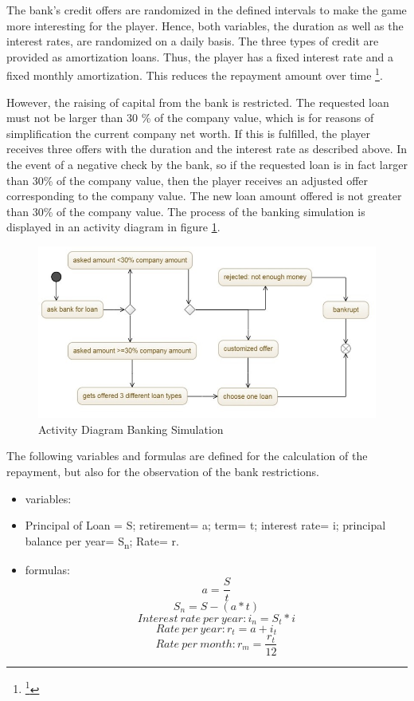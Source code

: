The bank's credit offers are randomized in the defined intervals to make the game more interesting for the player. Hence, both variables, the duration as well as the interest rates, are randomized on a daily basis. The three types of credit are provided as amortization loans. Thus, the player has a fixed interest rate and a fixed monthly amortization. This reduces the repayment amount over time \footnote{\footnote{https://www.investopedia.com/terms/a/amortized\_loan.asp}}.

However, the raising of capital from the bank is restricted.
The requested loan must not be larger than 30 \% of the company value, which is for reasons of simplification the current company net worth. If this is fulfilled, the player receives three offers with the duration and the interest rate as described above. In the event of a negative check by the bank, so if the requested loan is in fact larger than 30\% of the company value, then the player receives an adjusted offer corresponding to the company value. The new loan amount offered is not greater than 30\% of the company value. The process of the banking simulation is displayed in an activity diagram in figure \ref{jpg:banking}.

\begin{figure}
	\centering
	\includegraphics[width=12cm]{images/banking_activity_diagram.jpg}
	\caption{Activity Diagram Banking Simulation}
	\label{jpg:banking}
\end{figure}

The following variables and formulas are defined for the calculation of the repayment, but also for the observation of the bank restrictions.

\begin{itemize}
    \item variables:
    \item Principal of Loan = S; retirement= a; term= t; interest rate= i; principal balance per year= S\textsubscript{n}; Rate= r. 
    \item formulas:
 $$a={\dfrac{S}{t}}$$
 $$S_n=S-(a*t)$$
 $$Interest\ rate\ per\ year: i_n=S_t*i $$
 $$Rate\ per\ year: r_t=a+i_t$$
$$Rate\ per\ month:r_m= {\dfrac{r_t}{12}} $$
    
\end{itemize}

